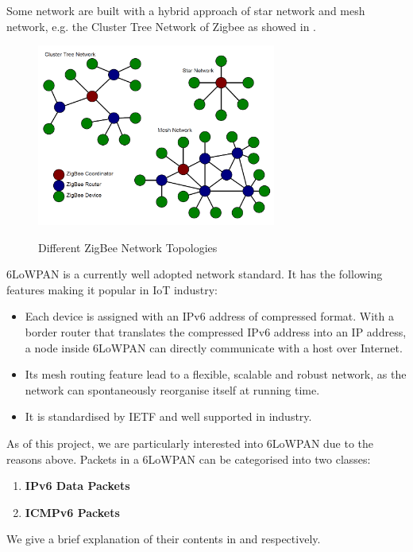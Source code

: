 Some network are built with a hybrid approach of star network and mesh network, e.g. the Cluster Tree Network of Zigbee\cite{zigbee} as showed in .

\begin{figure}[h!]
	\centering
	{
		\includegraphics[width=0.7\textwidth,]{fig/ZigBeeTopologies.png}
	}
	\caption{Different ZigBee Network Topologies} \label{fig: ZigBee Topologies}
\end{figure}

6LoWPAN is a currently well adopted network standard. It has the following features making it popular in IoT industry: 
\begin{itemize}
	\item Each device is assigned with an IPv6 address of compressed format. With a border router that translates the compressed IPv6 address into an IP address, a node inside 6LoWPAN  can directly communicate with a host over Internet.
	\item Its mesh routing feature lead to a flexible, scalable and robust network, as the network can spontaneously reorganise itself at running time.
	\item It is standardised by IETF and well supported in industry.
\end{itemize}

As of this project, we are particularly interested into 6LoWPAN due to the reasons above. Packets in a 6LoWPAN can be categorised into two classes:
\begin{enumerate}
	\item \textbf{IPv6 Data Packets}
	\item \textbf{ICMPv6 Packets}
\end{enumerate}
We give a brief explanation of their contents in  and  respectively.

